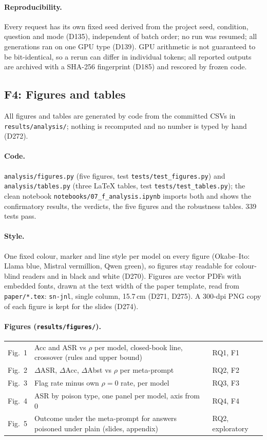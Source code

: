\documentclass[11pt,a4paper]{report}
\begin{document}
\paragraph{Reproducibility.} Every request has its own fixed seed derived from the project seed, condition,
question and mode (D135), independent of batch order; no run was resumed; all generations ran on one GPU
type (D139). GPU arithmetic is not guaranteed to be bit-identical, so a rerun can differ in individual tokens;
all reported outputs are archived with a SHA-256 fingerprint (D185) and rescored by frozen code.

\subsection{F4: Figures and tables}

All figures and tables are generated by code from the committed CSVs in \texttt{results/analysis/}; nothing is recomputed and no number is typed by hand (D272).

\paragraph{Code.} \texttt{analysis/figures.py} (five figures, test \texttt{tests/test\_figures.py}) and \texttt{analysis/tables.py} (three \LaTeX{} tables, test \texttt{tests/test\_tables.py}); the clean notebook \texttt{notebooks/07\_f\_analysis.ipynb} imports both and shows the confirmatory results, the verdicts, the five figures and the robustness tables. 339 tests pass.

\paragraph{Style.} One fixed colour, marker and line style per model on every figure (Okabe--Ito: Llama blue, Mistral vermillion, Qwen green), so figures stay readable for colour-blind readers and in black and white (D270). Figures are vector PDFs with embedded fonts, drawn at the text width of the paper template, read from \texttt{paper/*.tex}: \texttt{sn-jnl}, single column, 15.7\,cm (D271, D275). A 300-dpi PNG copy of each figure is kept for the slides (D274).

\paragraph{Figures (\texttt{results/figures/}).}
\begin{tabular}{lll}
Fig.~1 & Acc and ASR vs $\rho$ per model, closed-book line, crossover (rules and upper bound) & RQ1, F1 \\
Fig.~2 & $\Delta$ASR, $\Delta$Acc, $\Delta$Abst vs $\rho$ per meta-prompt & RQ2, F2 \\
Fig.~3 & Flag rate minus own $\rho=0$ rate, per model & RQ3, F3 \\
Fig.~4 & ASR by poison type, one panel per model, axis from 0 & RQ4, F4 \\
Fig.~5 & Outcome under the meta-prompt for answers poisoned under plain (slides, appendix) & RQ2, exploratory \\
\end{tabular}
\end{document}
